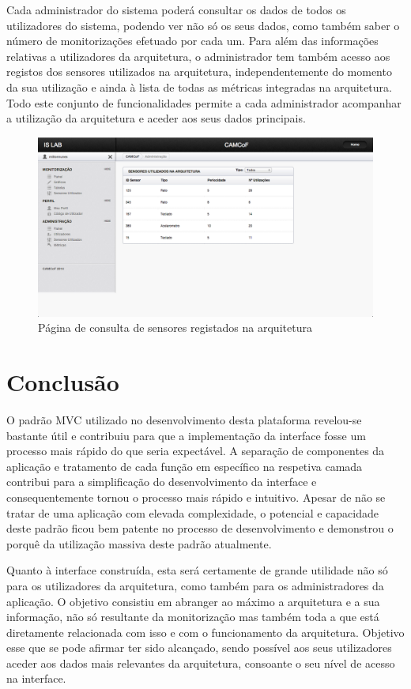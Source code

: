 Cada administrador do sistema poderá consultar os dados de todos os utilizadores do sistema, podendo ver não só os seus dados, como também saber o número de monitorizações efetuado por cada um. Para além das informações relativas a utilizadores da arquitetura, o administrador tem também acesso aos registos dos sensores utilizados na arquitetura, independentemente do momento da sua utilização e ainda à lista de todas as métricas integradas na arquitetura. Todo este conjunto de funcionalidades permite a cada administrador acompanhar a utilização da arquitetura e aceder aos seus dados principais.

\begin{figure}[htb]
   \centering
   \includegraphics[scale=0.29]{Images/sensores.png}
   \caption{Página de consulta de sensores registados na arquitetura}
\end{figure}


\section{Conclusão}

O padrão MVC utilizado no desenvolvimento desta plataforma revelou-se bastante útil e contribuiu para que a implementação da interface fosse um processo mais rápido do que seria expectável. A separação de componentes da aplicação e tratamento de cada função em específico na respetiva camada contribui para a simplificação do desenvolvimento da interface e consequentemente tornou o processo mais rápido e intuitivo. Apesar de não se tratar de uma aplicação com elevada complexidade, o potencial e capacidade deste padrão ficou bem patente no processo de desenvolvimento e demonstrou o porquê da utilização massiva deste padrão atualmente.

Quanto à interface construída, esta será certamente de grande utilidade não só para os utilizadores da arquitetura, como também para os administradores da aplicação. O objetivo consistiu em abranger ao máximo a arquitetura e a sua informação, não só resultante da monitorização mas também toda a que está diretamente relacionada com isso e com o funcionamento da arquitetura. Objetivo esse que se pode afirmar ter sido alcançado, sendo possível aos seus utilizadores aceder aos dados mais relevantes da arquitetura, consoante o seu nível de acesso na interface.

